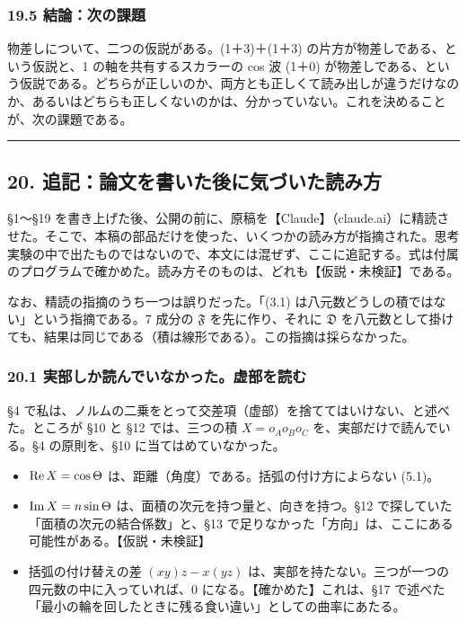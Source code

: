 \documentclass[
  a4paper,
]{ltjsarticle}
\providecommand{\tightlist}{%
  \setlength{\itemsep}{0pt}\setlength{\parskip}{0pt}}
\begin{document}
\subsubsection{19.5
結論：次の課題}\label{ux7d50ux8ad6ux6b21ux306eux8ab2ux984c}

物差しについて、二つの仮説がある。(1＋3)＋(1＋3)
の片方が物差しである、という仮説と、1 の軸を共有するスカラーの cos 波
(1＋0)
が物差しである、という仮説である。どちらが正しいのか、両方とも正しくて読み出しが違うだけなのか、あるいはどちらも正しくないのかは、分かっていない。これを決めることが、次の課題である。

\begin{center}\rule{0.5\linewidth}{0.5pt}\end{center}

\subsection{20.
追記：論文を書いた後に気づいた読み方}\label{ux8ffdux8a18ux8ad6ux6587ux3092ux66f8ux3044ux305fux5f8cux306bux6c17ux3065ux3044ux305fux8aadux307fux65b9}

§1〜§19
を書き上げた後、公開の前に、原稿を【Claude】（claude.ai）に精読させた。そこで、本稿の部品だけを使った、いくつかの読み方が指摘された。思考実験の中で出たものではないので、本文には混ぜず、ここに追記する。式は付属のプログラムで確かめた。読み方そのものは、どれも【仮説・未検証】である。

なお、精読の指摘のうち一つは誤りだった。「(3.1)
は八元数どうしの積ではない」という指摘である。7 成分の \(\mathfrak{F}\)
を先に作り、それに \(\mathfrak{D}\)
を八元数として掛けても、結果は同じである（積は線形である）。この指摘は採らなかった。

\subsubsection{20.1
実部しか読んでいなかった。虚部を読む}\label{ux5b9fux90e8ux3057ux304bux8aadux3093ux3067ux3044ux306aux304bux3063ux305fux865aux90e8ux3092ux8aadux3080}

§4
で私は、ノルムの二乗をとって交差項（虚部）を捨ててはいけない、と述べた。ところが
§10 と §12 では、三つの積 \(X = o_Ao_Bo_C\) を、実部だけで読んでいる。§4
の原則を、§10 に当てはめていなかった。

\begin{itemize}
\tightlist
\item
  \({\rm Re}\,X = \cos\Theta\)
  は、距離（角度）である。括弧の付け方によらない (5.1)。
\item
  \({\rm Im}\,X = n\sin\Theta\)
  は、面積の次元を持つ量と、向きを持つ。§12
  で探していた「面積の次元の結合係数」と、§13
  で足りなかった「方向」は、ここにある可能性がある。【仮説・未検証】
\item
  括弧の付け替えの差 \((xy)z - x(yz)\)
  は、実部を持たない。三つが一つの四元数の中に入っていれば、0
  になる。【確かめた】これは、§17
  で述べた「最小の輪を回したときに残る食い違い」としての曲率にあたる。
\end{itemize}
\end{document}
